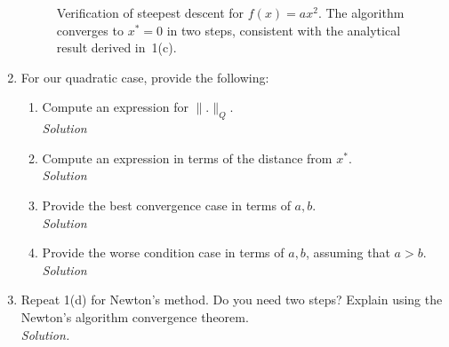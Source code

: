 \documentclass[11pt]{article}
\begin{document}
\begin{enumerate}[label=\textbf{1(\alph*)}]
		\begin{figure}[H]
			\centering
			\caption{Verification of steepest descent for $f(x)=a x^2$. The algorithm
				converges to $x^\ast=0$ in two steps, consistent with the analytical result
				derived in~1(c).}
		\end{figure}
		
		\item For our quadratic case, provide the following:
		\begin{enumerate}[label=\roman*.]
			\item Compute an expression for $\|.\|_Q$.\\[0.25em]
			\textit{Solution}
			
			\item Compute an expression in terms of the distance from $x^{\ast}$.\\[0.25em]
			\textit{Solution}
			
			\item Provide the best convergence case in terms of $a, b$.\\[0.25em]
			\textit{Solution}
			
			\item Provide the worse condition case in terms of $a, b$, assuming that $a > b$.\\[0.25em]
			\textit{Solution}
		\end{enumerate}
		
		\item Repeat 1(d) for Newton’s method. Do you need two steps? Explain using
		the Newton’s algorithm convergence theorem.\\[0.25em]
		\textit{Solution.}
	\end{enumerate}
	
\end{document}
